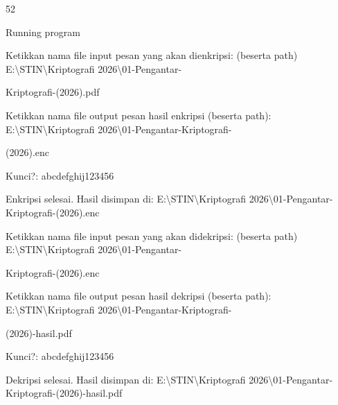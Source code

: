 \documentclass{article}
\begin{document}

52

Running program

Ketikkan nama file input pesan yang akan dienkripsi: (beserta path)  E:\textbackslash{}STIN\textbackslash{}Kriptografi 2026\textbackslash{}01-Pengantar-

Kriptografi-(2026).pdf

Ketikkan nama file output pesan hasil enkripsi (beserta path):  E:\textbackslash{}STIN\textbackslash{}Kriptografi 2026\textbackslash{}01-Pengantar-Kriptografi-

(2026).enc

Kunci?:  abcdefghij123456

Enkripsi selesai. Hasil disimpan di: E:\textbackslash{}STIN\textbackslash{}Kriptografi 2026\textbackslash{}01-Pengantar-Kriptografi-(2026).enc

Ketikkan nama file input pesan yang akan didekripsi: (beserta path)  E:\textbackslash{}STIN\textbackslash{}Kriptografi 2026\textbackslash{}01-Pengantar-

Kriptografi-(2026).enc

Ketikkan nama file output pesan hasil dekripsi (beserta path):  E:\textbackslash{}STIN\textbackslash{}Kriptografi 2026\textbackslash{}01-Pengantar-Kriptografi-

(2026)-hasil.pdf

Kunci?:  abcdefghij123456

Dekripsi selesai. Hasil disimpan di: E:\textbackslash{}STIN\textbackslash{}Kriptografi 2026\textbackslash{}01-Pengantar-Kriptografi-(2026)-hasil.pdf
\end{document}
